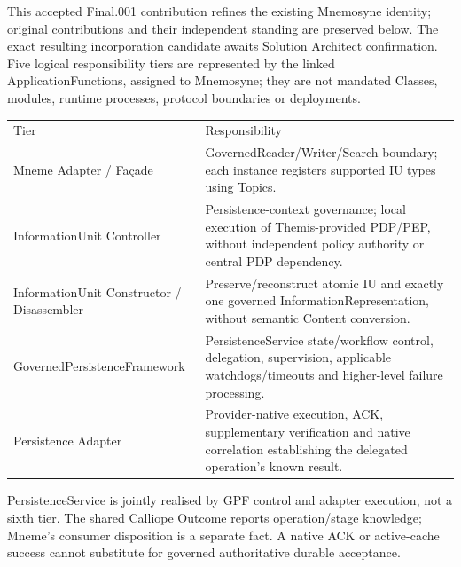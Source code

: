 This accepted Final.001 contribution refines the existing Mnemosyne identity; original contributions and their independent standing are preserved below. The exact resulting incorporation candidate awaits Solution Architect confirmation. Five logical responsibility tiers are represented by the linked ApplicationFunctions, assigned to Mnemosyne; they are not mandated Classes, modules, runtime processes, protocol boundaries or deployments.



\begin{longtable}{>{\raggedright\arraybackslash}p{}>{\raggedright\arraybackslash}p{}}
Tier & Responsibility \\
Mneme Adapter / Façade & GovernedReader/Writer/Search boundary; each instance registers supported IU types using Topics. \\
InformationUnit Controller & Persistence-context governance; local execution of Themis-provided PDP/PEP, without independent policy authority or central PDP dependency. \\
InformationUnit Constructor / Disassembler & Preserve/reconstruct atomic IU and exactly one governed InformationRepresentation, without semantic Content conversion. \\
GovernedPersistenceFramework & PersistenceService state/workflow control, delegation, supervision, applicable watchdogs/timeouts and higher-level failure processing. \\
Persistence Adapter & Provider-native execution, ACK, supplementary verification and native correlation establishing the delegated operation’s known result. \\
\end{longtable}


PersistenceService is jointly realised by GPF control and adapter execution, not a sixth tier. The shared Calliope Outcome reports operation/stage knowledge; Mneme’s consumer disposition is a separate fact. A native ACK or active-cache success cannot substitute for governed authoritative durable acceptance.



